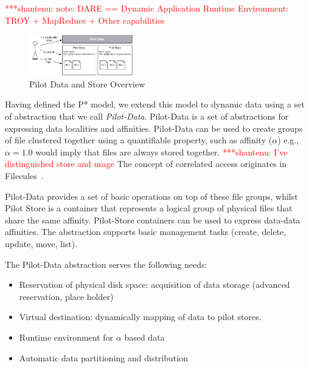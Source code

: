 \documentclass[conference,final]{IEEEtran}
\newcommand{\jhanote}[1]{ {\textcolor{red} { ***shantenu: #1 }}}
\newcommand{\jhanote}[1]{}
\begin{document}
\jhanote{note: DARE == Dynamic Application Runtime Environment: TROY +
  MapReduce + Other capabilities}



\begin{figure}[t]
    \centering
        \includegraphics[width=0.4\textwidth]{figures/pilotstore.pdf}
    \caption{Pilot Data and Store Overview}
    \label{fig:figures_pilotstore}
\end{figure}

Having defined the P* model, we extend this model to dynamic data using a set of 
abstraction that we call \emph{Pilot-Data}. Pilot-Data is a set of abstractions 
for expressing data localities and affinities. Pilot-Data can be used to create 
groups of file clustered together using a quantifiable property, such as 
affinity ($\alpha$) e.g., $\alpha = 1.0$ would imply that files are always 
stored together. \jhanote{I've distinguished store and usage} The concept of
correlated access originates in
Filecules~\cite{Doraimani:2008:FGS:1383422.1383429}.

Pilot-Data provides a set of basic operations on top of these file
groups, whilst Pilot Store is a container that represents a logical
group of physical files that share the same affinity. Pilot-Store 
containers can be used to express data-data affinities. The abstraction 
supports basic management tasks (create, delete, update,
move, list). 


The Pilot-Data abstraction serves the following needs:
\begin{itemize}
	\item Reservation of physical disk space: acquisition of data storage (advanced reservation, place holder)
	\item Virtual destination: dynamically mapping of data to pilot stores.
	\item Runtime environment for $\alpha$ based data
	\item Automatic data partitioning and distribution
\end{itemize}
\end{document}
